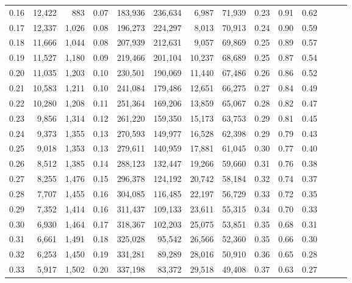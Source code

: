 \begin{tabular}{rrrrrrrrrrrrrr}
0.16 &  12,422 &    883 &  0.07 &  183,936 &  236,634 &   6,987 &  71,939 &  0.23 &  0.91 &      0.62 \\
0.17 &  12,337 &  1,026 &  0.08 &  196,273 &  224,297 &   8,013 &  70,913 &  0.24 &  0.90 &      0.59 \\
0.18 &  11,666 &  1,044 &  0.08 &  207,939 &  212,631 &   9,057 &  69,869 &  0.25 &  0.89 &      0.57 \\
0.19 &  11,527 &  1,180 &  0.09 &  219,466 &  201,104 &  10,237 &  68,689 &  0.25 &  0.87 &      0.54 \\
0.20 &  11,035 &  1,203 &  0.10 &  230,501 &  190,069 &  11,440 &  67,486 &  0.26 &  0.86 &      0.52 \\
0.21 &  10,583 &  1,211 &  0.10 &  241,084 &  179,486 &  12,651 &  66,275 &  0.27 &  0.84 &      0.49 \\
0.22 &  10,280 &  1,208 &  0.11 &  251,364 &  169,206 &  13,859 &  65,067 &  0.28 &  0.82 &      0.47 \\
0.23 &   9,856 &  1,314 &  0.12 &  261,220 &  159,350 &  15,173 &  63,753 &  0.29 &  0.81 &      0.45 \\
0.24 &   9,373 &  1,355 &  0.13 &  270,593 &  149,977 &  16,528 &  62,398 &  0.29 &  0.79 &      0.43 \\
0.25 &   9,018 &  1,353 &  0.13 &  279,611 &  140,959 &  17,881 &  61,045 &  0.30 &  0.77 &      0.40 \\
0.26 &   8,512 &  1,385 &  0.14 &  288,123 &  132,447 &  19,266 &  59,660 &  0.31 &  0.76 &      0.38 \\
0.27 &   8,255 &  1,476 &  0.15 &  296,378 &  124,192 &  20,742 &  58,184 &  0.32 &  0.74 &      0.37 \\
0.28 &   7,707 &  1,455 &  0.16 &  304,085 &  116,485 &  22,197 &  56,729 &  0.33 &  0.72 &      0.35 \\
0.29 &   7,352 &  1,414 &  0.16 &  311,437 &  109,133 &  23,611 &  55,315 &  0.34 &  0.70 &      0.33 \\
0.30 &   6,930 &  1,464 &  0.17 &  318,367 &  102,203 &  25,075 &  53,851 &  0.35 &  0.68 &      0.31 \\
0.31 &   6,661 &  1,491 &  0.18 &  325,028 &   95,542 &  26,566 &  52,360 &  0.35 &  0.66 &      0.30 \\
0.32 &   6,253 &  1,450 &  0.19 &  331,281 &   89,289 &  28,016 &  50,910 &  0.36 &  0.65 &      0.28 \\
0.33 &   5,917 &  1,502 &  0.20 &  337,198 &   83,372 &  29,518 &  49,408 &  0.37 &  0.63 &      0.27 \\

\end{tabular}
